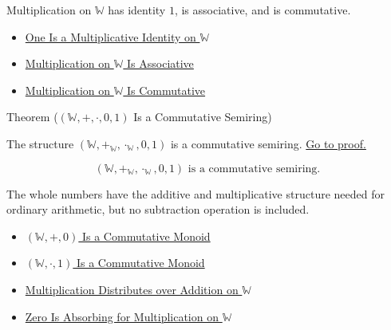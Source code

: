 \begin{remark*}[Interpretation]
Multiplication on $\mathbb{W}$ has identity $1$, is associative, and is
commutative.
\end{remark*}

\begin{dependencies}
\begin{itemize}
  \item \hyperref[thm:one-multiplicative-identity-on-w]{One Is a Multiplicative Identity on $\mathbb{W}$}
  \item \hyperref[thm:multiplication-on-w-associative]{Multiplication on $\mathbb{W}$ Is Associative}
  \item \hyperref[thm:multiplication-on-w-commutative]{Multiplication on $\mathbb{W}$ Is Commutative}
\end{itemize}
\end{dependencies}

\begin{theorembox}{Theorem (\texorpdfstring{$(\mathbb{W},+,\cdot,0,1)$}{(W,+,*,0,1)} Is a Commutative Semiring)}
\begin{theorem}
\label{thm:w-commutative-semiring}
The structure
$(\mathbb{W},+_{\mathbb{W}},\cdot_{\mathbb{W}},0,1)$ is a commutative
semiring.
\hyperref[prf:w-commutative-semiring]{Go to proof.}
\end{theorem}
\end{theorembox}

\begin{remark*}
\[
(\mathbb{W},+_{\mathbb{W}},\cdot_{\mathbb{W}},0,1)
\text{ is a commutative semiring}.
\]
\end{remark*}

\begin{remark*}[Interpretation]
The whole numbers have the additive and multiplicative structure needed for
ordinary arithmetic, but no subtraction operation is included.
\end{remark*}

\begin{dependencies}
\begin{itemize}
  \item \hyperref[thm:w-additive-commutative-monoid]{$(\mathbb{W},+,0)$ Is a Commutative Monoid}
  \item \hyperref[thm:w-multiplicative-commutative-monoid]{$(\mathbb{W},\cdot,1)$ Is a Commutative Monoid}
  \item \hyperref[thm:multiplication-distributes-over-addition-on-w]{Multiplication Distributes over Addition on $\mathbb{W}$}
  \item \hyperref[thm:zero-absorbing-for-multiplication-on-w]{Zero Is Absorbing for Multiplication on $\mathbb{W}$}
\end{itemize}
\end{dependencies}

